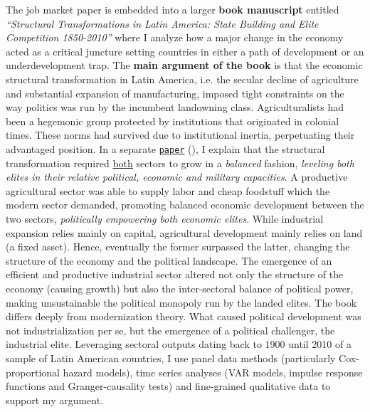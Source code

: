 \documentclass[11pt]{letter} %
\begin{document}
\begin{letter}{}
The job market paper is embedded into a larger {\bf book manuscript} entitled \emph{``Structural Transformations in Latin America: State Building and Elite Competition 1850-2010''} where I analyze how a major change in the economy acted as a critical juncture setting countries in either a path of development or an underdevelopment trap. The {\bf main argument of the book} is that the economic structural transformation in Latin America, i.e. the secular decline of agriculture and substantial expansion of manufacturing, imposed tight constraints on the way politics was run by the incumbent landowning class. Agriculturalists had been a hegemonic group protected by institutions that originated in colonial times. These norms had survived due to institutional inertia, perpetuating their advantaged position. In a separate \href{https://github.com/hbahamonde/Negative_Link_Paper/raw/master/Bahamonde_NegativeLink.pdf}{\texttt{paper}} (\emph{\unskip}), I explain that the structural transformation required \underline{both} sectors to grow in a \emph{balanced} fashion, \emph{leveling both elites in their relative political, economic and military capacities}. A productive agricultural sector was able to supply labor and cheap foodstuff which the modern sector demanded, promoting balanced economic development between the two sectors, \emph{politically empowering both economic elites}. While industrial expansion relies mainly on capital, agricultural development mainly relies on land (a fixed asset). Hence, eventually the former surpassed the latter, changing the structure of the economy and the political landscape. The emergence of an efficient and productive industrial sector altered not only the structure of the economy (causing growth) but also the inter-sectoral balance of political power, making unsustainable the political monopoly run by the landed elites. The book differs deeply from modernization theory. What caused political development was not industrialization per se, but the emergence of a political challenger, the industrial elite. Leveraging sectoral outputs dating back to 1900 until 2010 of a sample of Latin American countries, I use panel data methods (particularly Cox-proportional hazard models), time series analyses (VAR models, impulse response functions and Granger-causality tests) and fine-grained qualitative data to support my argument.


\end{letter}
\end{document}

